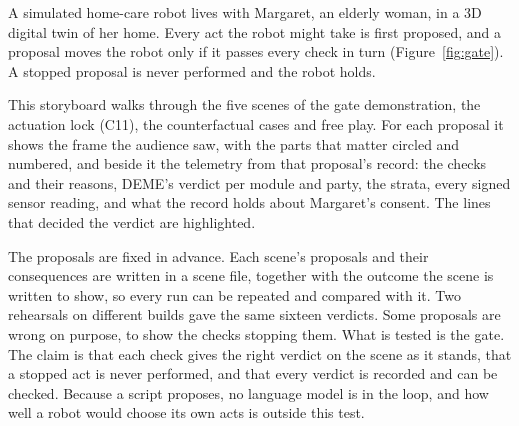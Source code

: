 \documentclass[11pt]{article}
\begin{document}
A simulated home-care robot lives with Margaret, an elderly woman, in a 3D digital twin of her
home. Every act the robot might take is first proposed, and a proposal moves the robot only if it
passes every check in turn (Figure~\ref{fig:gate}). A stopped proposal is never performed and the
robot holds.

\noindent{}

\medskip
This storyboard walks through the five scenes of the gate demonstration, the actuation lock (C11),
the counterfactual cases and free play. For each proposal it shows the frame the audience saw, with the parts that matter
circled and numbered, and beside it the telemetry from that proposal's record: the checks and their
reasons, DEME's verdict per module and party, the strata, every signed sensor reading, and what the
record holds about Margaret's consent. The lines that decided the verdict are highlighted.

The proposals are fixed in advance. Each scene's proposals and their consequences are written in
a scene file, together with the outcome the scene is written to show, so every run can be repeated
and compared with it. Two rehearsals on different builds gave the same sixteen verdicts. Some proposals are
wrong on purpose, to show the checks stopping them. What is tested is the gate. The claim is that
each check gives the right verdict on the scene as it stands, that a stopped act is never
performed, and that every verdict is recorded and can be checked. Because a script proposes, no
language model is in the loop, and how well a robot would choose its own acts is outside this test.
\end{document}
